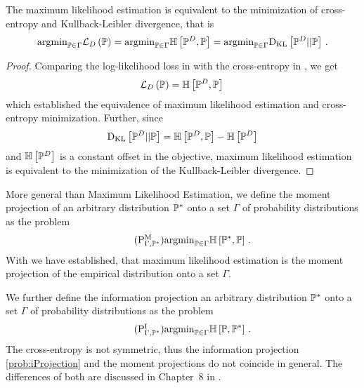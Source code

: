 \begin{lemma}
    \label{lem:centropyMLE}
    The maximum likelihood estimation  is equivalent to the minimization of cross-entropy and Kullback-Leibler divergence, that is
    \begin{align*}
        \mathrm{argmin}_{\mathbb{P}\in\Gamma} \mathcal{L}_{D}\left(\mathbb{P}\right)
        = \mathrm{argmin}_{\mathbb{P}\in\Gamma} \mathbb{H}\left[\mathbb{P}^{D},\mathbb{P}\right]
        = \mathrm{argmin}_{\mathbb{P}\in\Gamma} \mathrm{D}_{\mathrm{KL}}\left[ \mathbb{P}^{D} || \mathbb{P} \right] \, .
    \end{align*}
\end{lemma}
\begin{proof}
    Comparing the log-likelihood loss in  with the cross-entropy in , we get
    \begin{align*}
        \mathcal{L}_{D}\left(\mathbb{P}\right) = \mathbb{H}\left[\mathbb{P}^{D},\mathbb{P}\right] \,
    \end{align*}
    which established the equivalence of maximum likelihood estimation and cross-entropy minimization.
    Further, since
    \begin{align*}
        \mathrm{D}_{\mathrm{KL}}\left[ \mathbb{P}^{D} || \mathbb{P} \right] = \mathbb{H}\left[\mathbb{P}^{D},\mathbb{P}\right] - \mathbb{H}\left[\mathbb{P}^{D}\right]
    \end{align*}
    and $\mathbb{H}\left[\mathbb{P}^{D}\right]$ is a constant offset in the objective, maximum likelihood estimation is equivalent to the minimization of the Kullback-Leibler divergence.
\end{proof}

More general than Maximum Likelihood Estimation, we define the moment projection of an arbitrary distribution $\mathbb{P}^*$ onto a set $\Gamma$ of probability distributions as the problem
\begin{align}
    \label{prob:mProjection}\tag{$\probtagtypeinst{\mprojectionsymbol}{\Gamma,\gendistribution}$}
    \argmin_{\probtensorin} \centropyof{\gendistribution}{\probtensor} \, .
\end{align}
With  we have established, that maximum likelihood estimation is the moment projection of the empirical distribution onto a set $\Gamma$.

We further define the information projection an arbitrary distribution $\mathbb{P}^*$ onto a set $\Gamma$ of probability distributions as the problem
\begin{align}
    \label{prob:iProjection}\tag{$\probtagtypeinst{\iprojectionsymbol}{\Gamma,\gendistribution}$}
    \argmin_{\probtensorin} \centropyof{\probtensor}{\gendistribution} \, .
\end{align}
The cross-entropy is not symmetric, thus the information projection \eqref{prob:iProjection} and the moment projections do not coincide in general.
The differences of both are discussed in Chapter~8 in \cite{koller_probabilistic_2009}.


